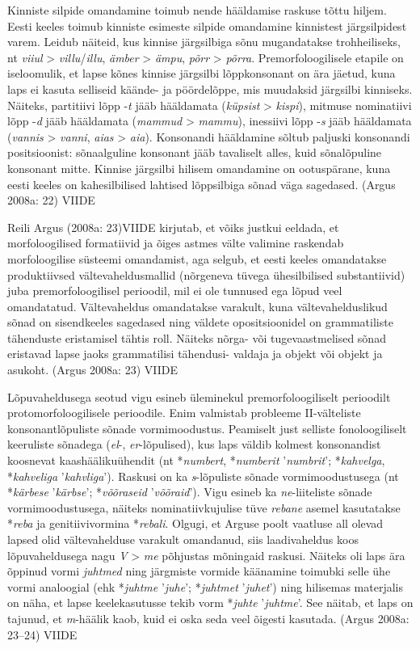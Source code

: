 \documentclass[12pt]{article}
\begin{document}
Kinniste silpide omandamine toimub nende hääldamise raskuse tõttu hiljem. Eesti keeles toimub kinniste esimeste silpide omandamine kinnistest järgsilpidest varem. Leidub näiteid, kus kinnise järgsilbiga sõnu mugandatakse trohheiliseks, nt \emph{viiul} > \emph{villu}/\emph{illu}, \emph{ämber} > \emph{ämpu}, \emph{põrr} > \emph{põrra}. Premorfoloogilisele etapile on iseloomulik, et lapse kõnes kinnise järgsilbi lõppkonsonant on ära jäetud, kuna laps ei kasuta selliseid käände- ja pöördelõppe, mis muudaksid järgsilbi kinniseks. Näiteks, partitiivi lõpp -\emph{t} jääb hääldamata (\emph{küpsist} > \emph{kispi}), mitmuse nominatiivi lõpp -\emph{d} jääb hääldamata (\emph{mammud} > \emph{mammu}), inessiivi lõpp -\emph{s} jääb hääldamata (\emph{vannis} > \emph{vanni}, \emph{aias} > \emph{aia}). Konsonandi hääldamine sõltub paljuski konsonandi positsioonist: sõnaalguline konsonant jääb tavaliselt alles, kuid sõnalõpuline konsonant mitte. Kinnise järgsilbi hilisem omandamine on ootuspärane, kuna eesti keeles on kahesilbilised lahtised lõppsilbiga sõnad väga sagedased. (Argus 2008a: 22) VIIDE


Reili Argus (2008a: 23)VIIDE kirjutab, et võiks justkui eeldada, et morfoloogilised formatiivid ja õiges astmes välte valimine raskendab morfoloogilise süsteemi omandamist, aga selgub, et eesti keeles omandatakse produktiivsed vältevaheldusmallid (nõrgeneva tüvega ühesilbilised substantiivid) juba premorfoloogilisel perioodil, mil ei ole tunnused ega lõpud veel omandatatud. Vältevaheldus omandatakse varakult, kuna vältevahelduslikud sõnad on sisendkeeles sagedased ning väldete opositsioonidel on grammatiliste tähenduste eristamisel tähtis roll. Näiteks nõrga- või tugevaastmelised sõnad eristavad lapse jaoks grammatilisi tähendusi- valdaja ja objekt või objekt ja asukoht. (Argus 2008a: 23) VIIDE

Lõpuvaheldusega seotud vigu esineb üleminekul premorfoloogiliselt perioodilt protomorfoloogilisele perioodile. Enim valmistab probleeme II-välteliste konsonantlõpuliste sõnade vormimoodustus. Peamiselt just selliste fonoloogiliselt keeruliste sõnadega (\emph{el}-, \emph{er}-lõpulised), kus laps väldib kolmest konsonandist koosnevat kaashäälikuühendit (nt *\emph{numbert}, *\emph{numberit} ’\emph{numbrit}’; *\emph{kahvelga}, *\emph{kahveliga} ’\emph{kahvliga}’). Raskusi on ka \emph{s}-lõpuliste sõnade vormimoodustusega (nt *\emph{kärbese} ’\emph{kärbse}’; *\emph{võõraseid} ’\emph{võõraid}’). Vigu esineb ka \emph{ne}-liiteliste sõnade vormimoodustusega, näiteks nominatiivkujulise tüve \emph{rebane} asemel kasutatakse *\emph{reba} ja genitiivivormina *\emph{rebali}. Olgugi, et Arguse poolt vaatluse all olevad lapsed olid vältevahelduse varakult omandanud, siis laadivaheldus koos lõpuvaheldusega nagu \emph{V} > \emph{me} põhjustas mõningaid raskusi. Näiteks oli laps ära õppinud vormi \emph{juhtmed} ning järgmiste vormide käänamine toimubki selle ühe vormi analoogial (ehk *\emph{juhtme} ’\emph{juhe}’; *\emph{juhtmet} ’\emph{juhet}’) ning hilisemas materjalis on näha, et lapse keelekasutusse tekib vorm *\emph{juhte} ’\emph{juhtme}’. See näitab, et laps on tajunud, et \emph{m}-häälik kaob, kuid ei oska seda veel õigesti kasutada. (Argus 2008a: 23–24) VIIDE
\end{document}
